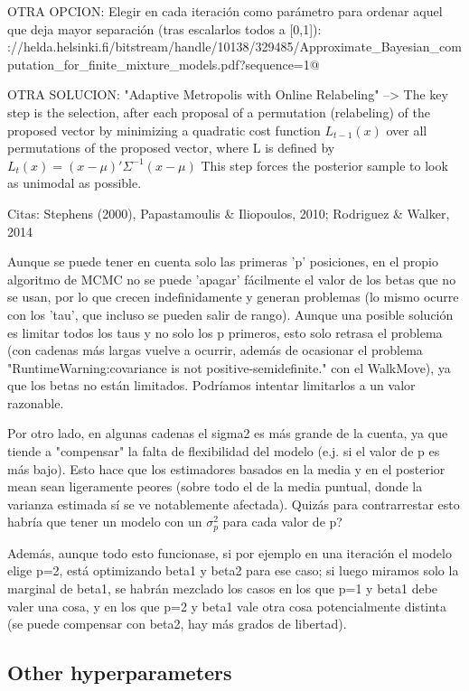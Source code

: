 \begin{outcomment}
OTRA OPCION: Elegir en cada iteración como parámetro para ordenar aquel que deja mayor separación (tras escalarlos todos a [0,1]): \verb@https://helda.helsinki.fi/bitstream/handle/10138/329485/Approximate_Bayesian_computation_for_finite_mixture_models.pdf?sequence=1@

OTRA SOLUCION: "Adaptive Metropolis with Online Relabeling" --> The key step is the selection, after each proposal of a permutation (relabeling) of the proposed vector by minimizing a quadratic cost function
$L_{t-1} (x)$ over all permutations of the proposed vector, where L is defined by
$L_t(x) = (x - \mu)'\Sigma^{-1}(x - \mu)$
This step forces the posterior sample to look as unimodal as possible.

Citas: Stephens (2000), Papastamoulis \& Iliopoulos, 2010; Rodriguez \& Walker, 2014
\end{outcomment}

Aunque se puede tener en cuenta solo las primeras 'p' posiciones, en el propio algoritmo de MCMC no se puede 'apagar' fácilmente el valor de los betas que no se usan, por lo que crecen indefinidamente y generan problemas (lo mismo ocurre con los 'tau', que incluso se pueden salir de rango). Aunque una posible solución es limitar todos los taus y no solo los p primeros, esto solo retrasa el problema (con cadenas más largas vuelve a ocurrir, además de ocasionar el problema "RuntimeWarning:covariance is not positive-semidefinite." con el WalkMove), ya que los betas no están limitados. Podríamos intentar limitarlos a un valor razonable.

Por otro lado, en algunas cadenas el sigma2 es más grande de la cuenta, ya que tiende a "compensar" la falta de flexibilidad del modelo (e.j. si el valor de p es más bajo). Esto hace que los estimadores basados en la media y en el posterior mean sean ligeramente peores (sobre todo el de la media puntual, donde la varianza estimada sí se ve notablemente afectada). Quizás para contrarrestar esto habría que tener un modelo con un $\sigma^2_p$ para cada valor de p?

Además, aunque todo esto funcionase, si por ejemplo en una iteración el modelo elige p=2, está optimizando beta1 y beta2 para ese caso; si luego miramos solo la marginal de beta1, se habrán mezclado los casos en los que p=1 y beta1 debe valer una cosa, y en los que p=2 y beta1 vale otra cosa potencialmente distinta (se puede compensar con beta2, hay más grados de libertad).

\subsection*{Other hyperparameters}

